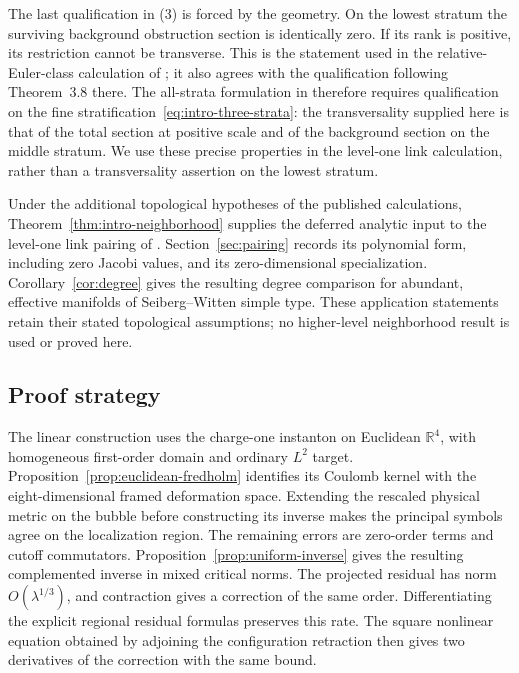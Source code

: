 \documentclass[11pt]{amsart}
\theoremstyle{definition}
\theoremstyle{remark}
\theoremstyle{plain}
\newcommand{\RR}{\mathbb{R}}
\begin{document}
The last qualification in (3) is forced by the geometry.  On the lowest
stratum the surviving background obstruction section is identically zero.
If its rank is positive, its restriction cannot be transverse.  This is the
statement used in the relative-Euler-class calculation of
\cite[Section~5]{FeehanLenessLevelOne}; it also agrees with the qualification
following Theorem~3.8 there.  The all-strata formulation in
\cite[Hypothesis~7.8.1(2)]{FeehanLenessCobordism} therefore requires
qualification on the fine stratification~\eqref{eq:intro-three-strata}:
the transversality supplied here is that of the total section at positive
scale and of the background section on the middle stratum.  We use these
precise properties in the level-one link calculation, rather than a
transversality assertion on the lowest stratum.

Under the additional topological hypotheses of the published
calculations, Theorem~\ref{thm:intro-neighborhood} supplies the deferred
analytic input to the level-one link pairing of
\cite[Theorem~6.1]{FeehanLenessLevelOne}.  Section~\ref{sec:pairing}
records its polynomial form, including zero Jacobi values, and its
zero-dimensional specialization.  Corollary~\ref{cor:degree} gives
the resulting degree comparison for abundant, effective manifolds of
Seiberg--Witten simple type.  These application statements retain their
stated topological assumptions; no
higher-level neighborhood result is used or proved here.

\subsection{Proof strategy}
The linear construction uses the charge-one instanton on Euclidean
$\RR^4$, with homogeneous first-order domain and ordinary $L^2$ target.
Proposition~\ref{prop:euclidean-fredholm} identifies its Coulomb kernel
with the eight-dimensional framed deformation space.  Extending the
rescaled physical metric on the bubble before constructing its inverse
makes the principal symbols agree on the localization region.  The
remaining errors are zero-order terms and cutoff commutators.
Proposition~\ref{prop:uniform-inverse} gives the resulting complemented
inverse in mixed critical norms.  The projected residual has norm
$O(\lambda^{1/3})$, and contraction gives a correction of the same order.
Differentiating the explicit regional residual formulas preserves this
rate.  The square nonlinear equation obtained by adjoining the
configuration retraction then gives two derivatives of the correction
with the same bound.
\end{document}
